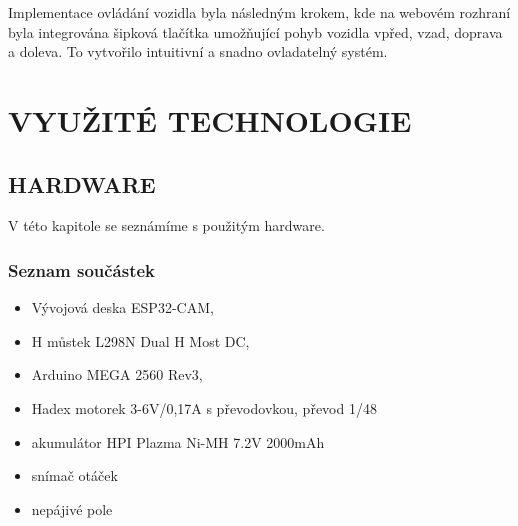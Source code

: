 \documentclass[12pt, a4paper,
oneside,      %
openany
]{report}
\begin{document}
\noindent Implementace ovládání vozidla byla následným krokem, kde na webovém rozhraní byla integrována šipková tlačítka umožňující pohyb vozidla vpřed, vzad, doprava a doleva. To vytvořilo intuitivní a snadno ovladatelný systém.


\chapter{VYUŽITÉ TECHNOLOGIE}

\section{HARDWARE}

\noindent V této kapitole se seznámíme s použitým hardware.

\subsection{Seznam součástek}
\begin{itemize}
    \item Vývojová deska ESP32-CAM,
    \item H můstek L298N Dual H Most DC,
    \item Arduino MEGA 2560 Rev3,
    \item Hadex motorek 3-6V/0,17A s převodovkou, převod 1/48
    \item akumulátor HPI Plazma Ni-MH 7.2V 2000mAh 
    \item snímač otáček
    \item nepájivé pole
\end{itemize}
\end{document}
